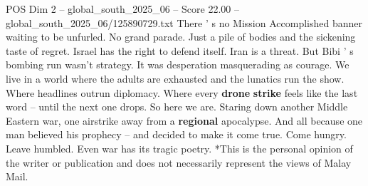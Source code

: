 \begin{textsample}{POS Dim 2 – global\_south\_2025\_06 – Score 22.00 – global\_south\_2025\_06/125890729.txt}
There ' s no Mission Accomplished banner waiting to be unfurled.
No grand parade.
Just a pile of bodies and the sickening taste of regret.
Israel has the right to defend itself.
Iran is a threat.
But Bibi ' s bombing run wasn't strategy.
It was desperation masquerading as courage.
We live in a world where the adults are exhausted and the lunatics run the show.
Where headlines outrun diplomacy.
Where every \textbf{drone} \textbf{strike} feels like the last word -- until the next one drops.
So here we are.
Staring down another Middle Eastern war, one airstrike away from a \textbf{regional} apocalypse.
And all because one man believed his prophecy -- and decided to make it come true.
Come hungry.
Leave humbled.
Even war has its tragic poetry. *This is the personal opinion of the writer or publication and does not necessarily represent the views of Malay Mail.

\end{textsample}
